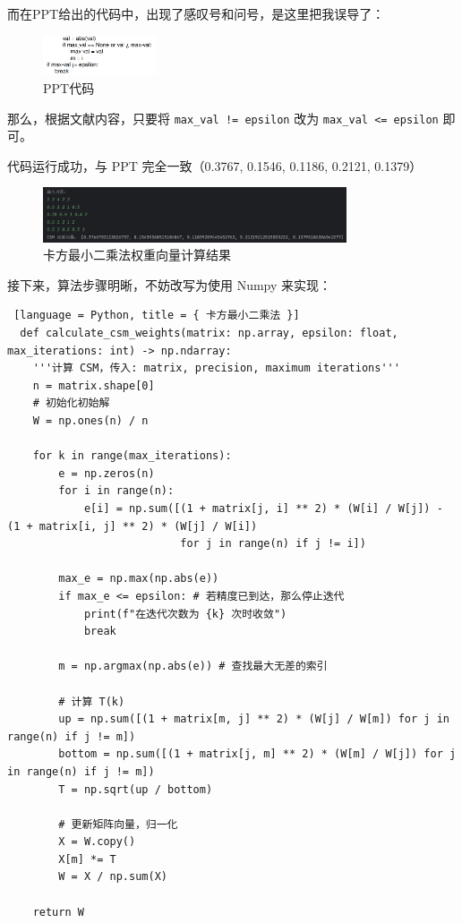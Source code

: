 而在PPT给出的代码中，出现了感叹号和问号，是这里把我误导了：

\begin{figure} [H]
  \centering
  \includegraphics[width=0.3\textwidth]{img6/PPTCode.png}
  \caption{PPT代码}
\end{figure}

那么，根据文献内容，只要将 \texttt{max\_val != epsilon} 改为 \texttt{max\_val <= epsilon} 即可。

代码运行成功，与 PPT 完全一致（0.3767, 0.1546, 0.1186, 0.2121, 0.1379）

\begin{figure}[H]
  \centering
  \includegraphics[width=0.8\textwidth]{img6/CSMtest.png}
  \caption{卡方最小二乘法权重向量计算结果}
\end{figure}

接下来，算法步骤明晰，不妨改写为使用 Numpy 来实现：

\begin{lstlisting} [language = Python, title = { 卡方最小二乘法 }]
  def calculate_csm_weights(matrix: np.array, epsilon: float, max_iterations: int) -> np.ndarray:
    '''计算 CSM，传入: matrix, precision, maximum iterations'''
    n = matrix.shape[0]
    # 初始化初始解
    W = np.ones(n) / n

    for k in range(max_iterations):
        e = np.zeros(n)
        for i in range(n):
            e[i] = np.sum([(1 + matrix[j, i] ** 2) * (W[i] / W[j]) - (1 + matrix[i, j] ** 2) * (W[j] / W[i])
                           for j in range(n) if j != i])

        max_e = np.max(np.abs(e))
        if max_e <= epsilon: # 若精度已到达，那么停止迭代
            print(f"在迭代次数为 {k} 次时收敛")
            break

        m = np.argmax(np.abs(e)) # 查找最大无差的索引

        # 计算 T(k)
        up = np.sum([(1 + matrix[m, j] ** 2) * (W[j] / W[m]) for j in range(n) if j != m])
        bottom = np.sum([(1 + matrix[j, m] ** 2) * (W[m] / W[j]) for j in range(n) if j != m])
        T = np.sqrt(up / bottom)

        # 更新矩阵向量，归一化
        X = W.copy()
        X[m] *= T
        W = X / np.sum(X)

    return W
\end{lstlisting}

